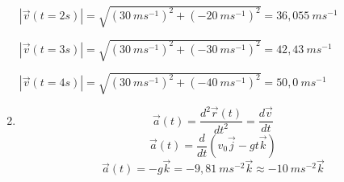 \begin{enumerate}[label=\alph*)]
$|\vec{v}(t=2s)|  = \sqrt{ (30\ ms^{-1})^2 + (-20\ ms^{-1})^2 } = 36,055\ ms^{-1}  $

$|\vec{v}(t=3s)|  = \sqrt{ (30\ ms^{-1})^2 + (-30\ ms^{-1})^2 } = 42,43\ ms^{-1}  $

$|\vec{v}(t=4s)|  = \sqrt{ (30\ ms^{-1})^2 + (-40\ ms^{-1})^2 } = 50,0\ ms^{-1}  $


\item $$\vec{a}(t)  = \frac{d^2\vec{r}(t)}{dt^2}=\frac{d\vec{v}}{dt}$$
$$\vec{a}(t)  = \frac{d} {dt} \left( v_0\vec{j}-gt\vec{k}  \right)$$
$$ \vec{a}(t)  =  -g\vec{k}=-9,81\ ms^{-2}\vec{k}\approx -10\ ms^{-2}\vec{k} $$

\end{enumerate}
